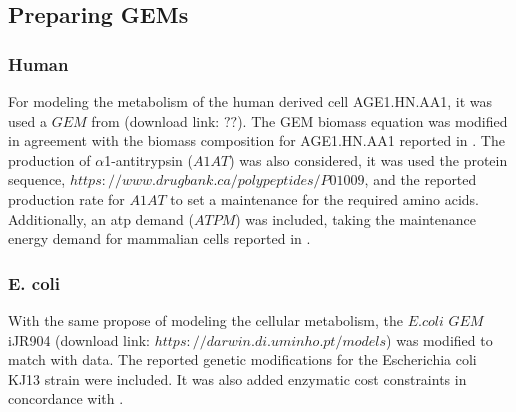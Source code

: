 	\subsection{Preparing GEMs} 
	
	\subsubsection{Human}
	For modeling the metabolism of the human derived cell AGE1.HN.AA1, it was used a $GEM$ from (download link: $??$). The GEM biomass equation was modified in agreement with the  biomass composition for AGE1.HN.AA1 reported in . The production of $\alpha$1-antitrypsin ($A1AT$) was also considered, it was used the protein sequence, $https://www.drugbank.ca/polypeptides/P01009$, and the reported production rate for $A1AT$  to set a maintenance for the required amino acids. Additionally, an atp demand ($ATPM$) was included, taking the maintenance energy demand for mammalian cells reported in  .
	
	\subsubsection{E. coli}
	With the same propose of modeling the cellular metabolism, the $E. coli$ $GEM$ iJR904  (download link: $https://darwin.di.uminho.pt/models$) was modified to match with  data. The reported genetic modifications for the Escherichia coli KJ13 strain were included. It was also added enzymatic cost constraints in concordance with .